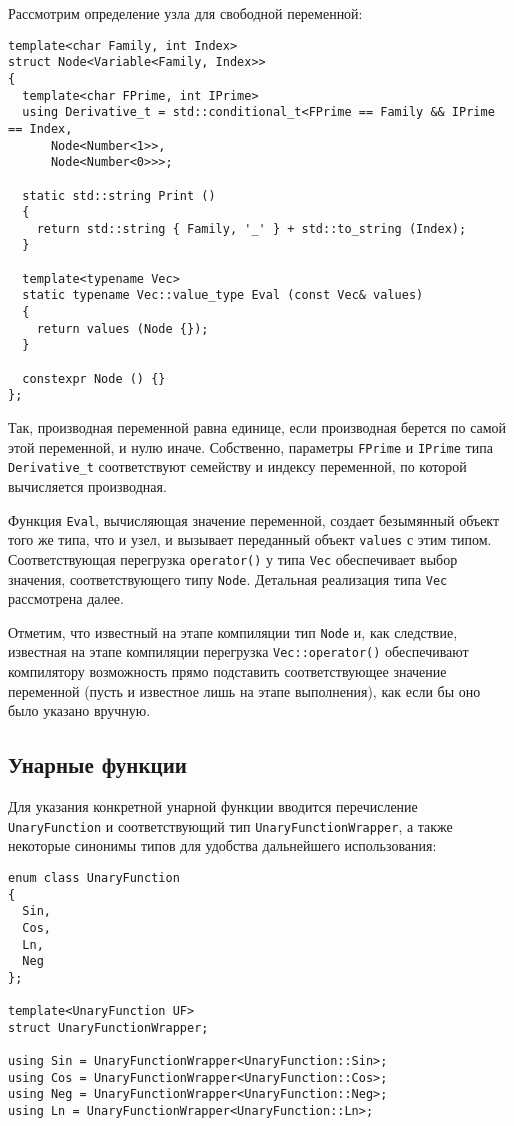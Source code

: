 \documentclass[11pt,a4paper]{article}
\begin{document}
Рассмотрим определение узла для свободной переменной:
\begin{lstlisting}
template<char Family, int Index>
struct Node<Variable<Family, Index>>
{
  template<char FPrime, int IPrime>
  using Derivative_t = std::conditional_t<FPrime == Family && IPrime == Index,
      Node<Number<1>>,
      Node<Number<0>>>;

  static std::string Print ()
  {
    return std::string { Family, '_' } + std::to_string (Index);
  }

  template<typename Vec>
  static typename Vec::value_type Eval (const Vec& values)
  {
    return values (Node {});
  }

  constexpr Node () {}
};
\end{lstlisting}

Так, производная переменной равна единице, если производная берется по самой этой переменной,
и нулю иначе. Собственно, параметры \texttt{FPrime} и \texttt{IPrime} типа \texttt{Derivative\_t}
соответствуют семейству и индексу переменной, по которой вычисляется производная.

Функция \texttt{Eval}, вычисляющая значение переменной, создает безымянный объект того же типа,
что и узел, и вызывает переданный объект \texttt{values} с этим типом. Соответствующая перегрузка
\texttt{operator()} у типа \texttt{Vec} обеспечивает выбор значения, соответствующего типу
\texttt{Node}. Детальная реализация типа \texttt{Vec} рассмотрена далее.

Отметим, что известный на этапе компиляции тип \texttt{Node} и, как следствие, известная на этапе
компиляции перегрузка \texttt{Vec::operator()} обеспечивают компилятору возможность прямо подставить
соответствующее значение переменной (пусть и известное лишь на этапе выполнения), как если бы оно
было указано вручную.

\subsection{Унарные функции}

Для указания конкретной унарной функции вводится перечисление \texttt{UnaryFunction} и
соответствующий тип \texttt{UnaryFunctionWrapper}, а также некоторые синонимы типов для удобства
дальнейшего использования:
\begin{lstlisting}
enum class UnaryFunction
{
  Sin,
  Cos,
  Ln,
  Neg
};

template<UnaryFunction UF>
struct UnaryFunctionWrapper;

using Sin = UnaryFunctionWrapper<UnaryFunction::Sin>;
using Cos = UnaryFunctionWrapper<UnaryFunction::Cos>;
using Neg = UnaryFunctionWrapper<UnaryFunction::Neg>;
using Ln = UnaryFunctionWrapper<UnaryFunction::Ln>;
\end{lstlisting}
\end{document}
